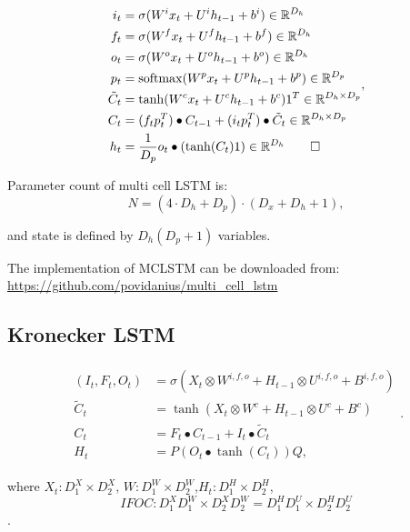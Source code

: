 \documentclass[a4paper,11pt]{article}
\makeatletter
\newcommand{\change@uppercase@math}{%
  \count@=`\A
  \loop
    \mathcode\count@\count@
    \ifnum\count@<`\Z
    \advance\count@\@ne
  \repeat}
\newcommand{\softmax}[1]{
  \mathrm{softmax}(
}
\makeatother
\begin{document}
\begin{align}
\begin{split}
\label{LSTM}
i_{t} &=\sigma(W^{i}x_{t} + U^{i}h_{t-1} + b^{i}) \in \mathbb{R}^{D_{h}}\\
f_{t} &=\sigma(W^{f}x_{t} + U^{f}h_{t-1} + b^{f})\in \mathbb{R}^{D_{h}}\\
o_{t} &=\sigma(W^{o}x_{t} + U^{o}h_{t-1} + b^{o})\in \mathbb{R}^{D_{h}}\\
p_{t} &=\softmax(W^{p}x_{t} + U^{p}h_{t-1} + b^{p}) \in \mathbb{R}^{D_{p}}\\
\tilde{C}_{t} &= \tanh(W^{c}x_{t} + U^{c}h_{t-1} + b^{c})1^{T}\in \mathbb{R}^{D_{h}
\times D_{p}}\\
C_{t} &=(f_{t} p_{t}^{T}) \bullet C_{t-1} + (i_{t} p_{t}^{T}) \bullet \tilde{C}_{t}\in \mathbb{R}^{D_{h}\times D_{p}} \\
h_{t} &= \frac{1}{D_{p}} o_{t} \bullet (\tanh(C_{t}) 1) \in \mathbb{R}^{D_{h}}\qedhere
\end{split},
\end{align}

Parameter count of multi cell LSTM is:
\begin{equation}
\label{eq:multi_cell_lstm_parameter_count}
N =  (4 \cdot D_{h}  + D_{p})\cdot (D_{x}  + D_{h} + 1),
\end{equation}

and state is defined by $D_{h}(D_{p} + 1)$ variables.

The implementation of MCLSTM can be downloaded from:
\url{https://github.com/povidanius/multi_cell_lstm}

\subsection{Kronecker LSTM}
\begin{align}
\begin{split}
(I_{t},F_{t}, O_{t}) &=\sigma(X_{t} \otimes  W^{i,f,o} + H_{t-1} \otimes U^{i,f,o}  +  B^{i,f,o})\\
\tilde{C}_{t} &=\tanh(X_{t} \otimes  W^{c} + H_{t-1} \otimes U^{c}  +  B^{c})\\
C_{t} &= F_{t} \bullet C_{t-1} + I_{t} \bullet \tilde{C}_{t}\\
H_{t} &= P(O_{t}\bullet \tanh(C_{t}))Q,
\end{split}.
\end{align}

where $X_{t}: D_{1}^{X} \times D_{2}^{X}$, $W: D_{1}^{W} \times D_{2}^{W}$,$H_{t}: D_{1}^{H} \times D_{2}^{H}$,
$$ IFOC: D_{1}^{X}D_{1}^{W} \times D_{2}^{X}D_{2}^{W} = D_{1}^{H}D_{1}^{U} \times D_{2}^{H}D_{2}^{U}  $$.
\end{document}
